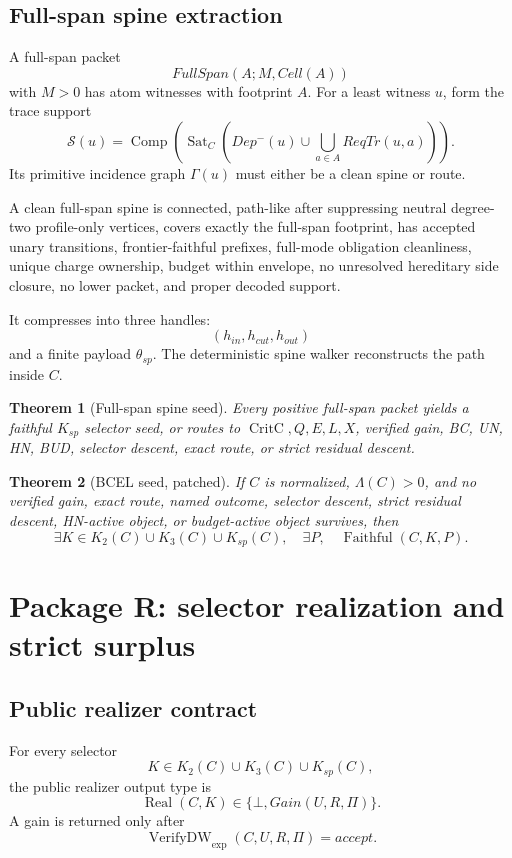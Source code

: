 \documentclass[10.5pt,a4paper]{article}
\newtheorem{theorem}{Theorem}[section]
\newcommand{\Sat}{\operatorname{Sat}}
\newcommand{\Comp}{\operatorname{Comp}}
\newcommand{\Real}{\operatorname{Real}}
\newcommand{\VerifyDW}{\operatorname{VerifyDW}_{\exp}}
\newcommand{\Faithful}{\operatorname{Faithful}}
\newcommand{\CritC}{\operatorname{CritC}}
\newcommand{\Bot}{\bot}
\begin{document}
\subsection{Full-span spine extraction}
A full-span packet
\[
FullSpan(A;M,Cell(A))
\]
with \(M>0\) has atom witnesses with footprint \(A\). For a least witness \(u\), form the trace support
\[
\mathcal S(u)=\Comp(\Sat_C(Dep^-(u)\cup \bigcup_{a\in A}ReqTr(u,a))).
\]
Its primitive incidence graph \(\Gamma(u)\) must either be a clean spine or route.

A clean full-span spine is connected, path-like after suppressing neutral degree-two profile-only vertices, covers exactly the full-span footprint, has accepted unary transitions, frontier-faithful prefixes, full-mode obligation cleanliness, unique charge ownership, budget within envelope, no unresolved hereditary side closure, no lower packet, and proper decoded support.

It compresses into three handles:
\[
(h_{in},h_{cut},h_{out})
\]
and a finite payload \(\theta_{sp}\). The deterministic spine walker reconstructs the path inside \(C\).

\begin{theorem}[Full-span spine seed]
Every positive full-span packet yields a faithful \(K_{sp}\) selector seed, or routes to \(\CritC,Q,E,L,X\), verified gain, BC, UN, HN, BUD, selector descent, exact route, or strict residual descent.
\end{theorem}

\begin{theorem}[BCEL seed, patched]
If \(C\) is normalized, \(\Lambda(C)>0\), and no verified gain, exact route, named outcome, selector descent, strict residual descent, HN-active object, or budget-active object survives, then
\[
\exists K\in K_2(C)\cup K_3(C)\cup K_{sp}(C),\quad \exists P,
\quad \Faithful(C,K,P).
\]
\end{theorem}

\section{Package R: selector realization and strict surplus}

\subsection{Public realizer contract}
For every selector
\[
K\in K_2(C)\cup K_3(C)\cup K_{sp}(C),
\]
the public realizer output type is
\[
\Real(C,K)\in\{\Bot,Gain(U,R,\Pi)\}.
\]
A gain is returned only after
\[
\VerifyDW(C,U,R,\Pi)=accept.
\]
\end{document}
